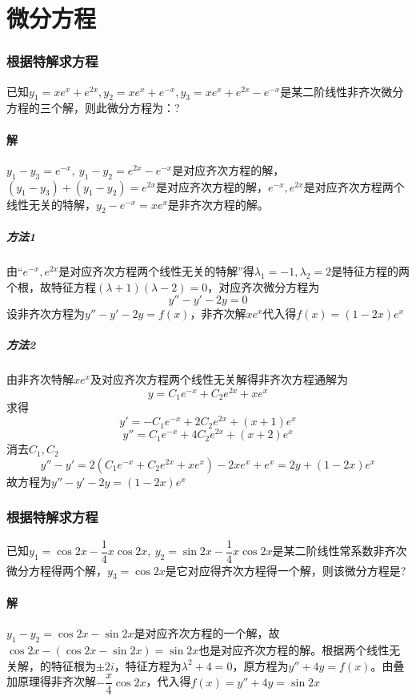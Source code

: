 \section{微分方程}

\subsubsection{根据特解求方程}
已知\(y_1 = xe^x + e^{2x}, y_2 = xe^x + e^{-x}, y_3 = xe^x + e^{2x} - e^{-x}\)是某二阶线性非齐次微分方程的三个解，则此微分方程为：?
\paragraph{解}
\(y_1 - y_3 = e^{-x},\ y_1 - y_2 = e^{2x} - e^{-x}\)是对应齐次方程的解，\((y_1 - y_3) + (y_1 - y_2) = e^{2x}\)是对应齐次方程的解，\(e^{-x}, e^{2x}\)是对应齐次方程两个线性无关的特解，\(y_2 - e^{-x} = xe^x\)是非齐次方程的解。

\subparagraph{方法1}
由“\(e^{-x}, e^{2x}\)是对应齐次方程两个线性无关的特解”得\(\lambda_1 = -1, \lambda_2 = 2\)是特征方程的两个根，故特征方程\((\lambda + 1)(\lambda - 2) = 0\)，对应齐次微分方程为\[y'' - y' - 2y = 0\]
设非齐次方程为\(y'' - y' - 2y = f(x)\)，非齐次解\(xe^x\)代入得\(f(x) = (1 - 2x)e^x\)

\subparagraph{方法2}
由非齐次特解\(xe^x\)及对应齐次方程两个线性无关解得非齐次方程通解为\[y = C_1e^{-x} + C_2e^{2x} + xe^x\]
求得\[y' = -C_1e^{-x} + 2C_2e^{2x} + (x + 1)e^x\]
\[y'' = C_1e^{-x} + 4C_2e^{2x} + (x + 2)e^x\]
消去\(C_1, C_2\)\[y'' - y' = 2(C_1e^{-x} + C_2e^{2x} + xe^x) - 2xe^x + e^x = 2y + (1 - 2x)e^x\]
故方程为\(y'' - y' - 2y = (1 - 2x)e^x\)


\subsubsection{根据特解求方程}
已知\(y_1 = \cos2x - \dfrac{1}{4}x\cos2x,\ y_2 = \sin2x - \dfrac{1}{4}x\cos2x\)是某二阶线性常系数非齐次微分方程得两个解，\(y_3 = \cos2x\)是它对应得齐次方程得一个解，则该微分方程是?

\paragraph{解}
\(y_1 - y_2 = \cos2x - \sin2x\)是对应齐次方程的一个解，故\(\cos2x - (\cos2x - \sin2x) = \sin2x\)也是对应齐次方程的解。根据两个线性无关解，的特征根为\(\pm2i\)，特征方程为\(\lambda^2 + 4 = 0\)，原方程为\(y'' + 4y = f(x)\)。由叠加原理得非齐次解\(-\dfrac{x}{4}\cos2x\)，代入得\(f(x) = y'' + 4y = \sin2x\)


